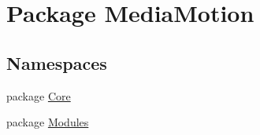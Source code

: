 \hypertarget{namespace_media_motion}{\section{Package Media\+Motion}
\label{namespace_media_motion}
}
\subsection*{Namespaces}
\begin{DoxyCompactItemize}
\item 
package \hyperlink{namespace_media_motion_1_1_core}{Core}
\item 
package \hyperlink{namespace_media_motion_1_1_modules}{Modules}
\end{DoxyCompactItemize}
